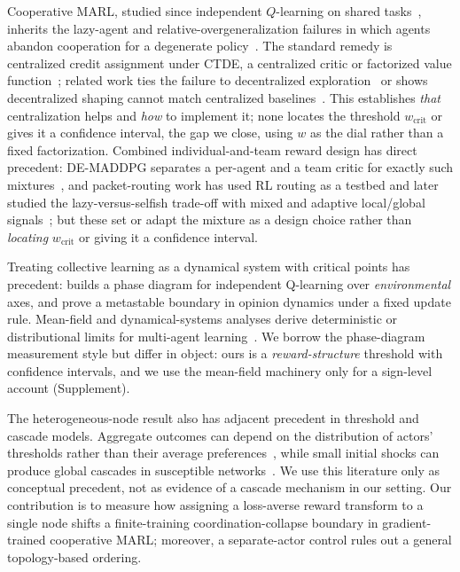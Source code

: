 \documentclass[letterpaper]{article} %
\theoremstyle{plain}
\newcommand{\wcrit}{w_{\mathrm{crit}}}
\begin{document}
Cooperative MARL, studied since independent $Q$-learning on shared
tasks~\citep{tan1993multi,busoniu2008comprehensive}, inherits the lazy-agent and
relative-overgeneralization failures in which agents abandon cooperation for a degenerate
policy~\citep{liu2023lazy,peng2023curo,tampuu2017multiagent}. The standard remedy is centralized
credit assignment under CTDE, a centralized critic or factorized value
function~\citep{lowe2017multi,yu2022surprising,sunehag2018vdn,rashid2018qmix,foerster2018counterfactual,son2019qtran};
related work ties the failure to
decentralized exploration~\citep{weng2026} or shows decentralized shaping cannot match centralized
baselines~\citep{dmarl2025}. This establishes \emph{that} centralization helps and \emph{how} to
implement it; none locates the threshold $\wcrit$ or gives it a confidence interval, the gap we
close, using $w$ as the dial rather than a fixed factorization. Combined individual-and-team reward
design has direct precedent: DE-MADDPG separates a per-agent and a team critic for exactly such
mixtures~\citep{demaddpg2020}, and packet-routing work has used RL routing as a testbed and later
studied the lazy-versus-selfish trade-off with mixed and adaptive local/global
signals~\citep{packetrouting,mao2020reward}; but these set or adapt
the mixture as a design choice rather than \emph{locating} $\wcrit$ or giving it a confidence
interval.

Treating collective learning as a dynamical system with critical points has
precedent: \citet{yamaguchi2025} builds a phase diagram for independent Q-learning over
\emph{environmental} axes, and \citet{capannoli2026phase} prove a metastable boundary in opinion
dynamics under a fixed update rule. Mean-field and dynamical-systems analyses derive deterministic or
distributional limits for multi-agent learning~\citep{hu2019meanfield,barfuss2019deterministic,hussain2025convergence}.
We borrow the phase-diagram measurement style but differ in object: ours is a \emph{reward-structure}
threshold with confidence intervals, and we use the mean-field machinery only for a sign-level account
(Supplement).

The heterogeneous-node result also has adjacent precedent in threshold and cascade models. Aggregate
outcomes can depend on the distribution of actors' thresholds rather than their average
preferences~\citep{granovetter1978threshold}, while small initial shocks can produce global cascades in
susceptible networks~\citep{watts2002global}. We use this literature only as conceptual precedent, not
as evidence of a cascade mechanism in our setting. Our contribution is to measure how assigning a
loss-averse reward transform to a single node shifts a finite-training coordination-collapse boundary in
gradient-trained cooperative MARL; moreover, a separate-actor control rules out a general
topology-based ordering.
\end{document}
